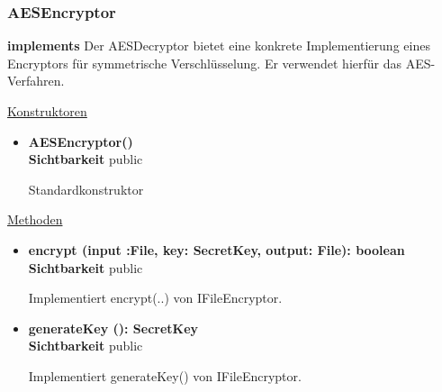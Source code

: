 \subsubsection{AESEncryptor} \label{app:klasse:AESEncryptor}
\textbf{implements}  \newline
Der AESDecryptor bietet eine konkrete Implementierung eines  Encryptors für symmetrische Verschlüsselung. Er verwendet hierfür das AES-Verfahren.\newline

\underline{Konstruktoren}
\begin{itemize}
\itemsep0pt
\item \textbf{AESEncryptor()} \hfill\\
\textbf{Sichtbarkeit} public

Standardkonstruktor
\end{itemize}

\underline{Methoden}
\begin{itemize}
\itemsep0pt
\item \textbf{encrypt (input :File, key: SecretKey, output: File): boolean}\hfill\\
\textbf{Sichtbarkeit} public

Implementiert encrypt(..) von IFileEncryptor.

\item \textbf{generateKey (): SecretKey}\hfill\\
\textbf{Sichtbarkeit} public

Implementiert generateKey() von IFileEncryptor.

\end{itemize}